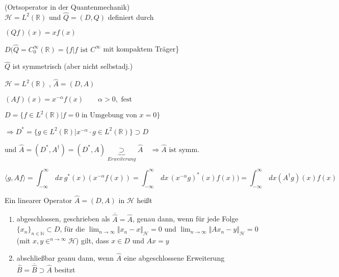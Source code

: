 


\begin{Bsp}{(Ortsoperator in der Quantenmechanik)\\}
    $\mathcal{H} = L^2(\mathbb{R})$ und $\hat{Q} = (D,Q)$ definiert durch

    $(Qf)(x) = x f(x)$

    $D(\hat{Q} = C_0^\infty (\mathbb{R})= \{f | f \textrm{ ist } C^\infty$ mit kompaktem Träger\}

    $\hat{Q}$ ist symmetrisch (aber nicht selbstadj.)
\end{Bsp}

\begin{Bsp}
    $\mathcal{H} = L^2(\mathbb{R})$ , $\hat{A} = (D,A)$

    $(Af)(x) = x^{-\alpha} f(x) \quad \quad \alpha > 0, \textrm{ fest}$

    $D = \{f \in L^2(\mathbb{R}) | f=0 \textrm{ in Umgebung von } x = 0 \}$

    $\Rightarrow D^\ast = \{g \in L^2(\mathbb{R}) | x^{- \alpha} \cdot g \in L^2(\mathbb{R})\} \supset D$

    und $\hat{A} = (D^\ast, A^\dagger) = (D^\ast, A) \underbrace{\supset}_{Erweiterung} \hat{A} \quad \Rightarrow \hat{A} \textrm{ ist symm.}$ 

    $$\langle g , Af \rangle = \int_{-\infty}^\infty \,dx \, g^\ast(x) (x^{- \alpha} f(x)) = 
    \int_{-\infty}^\infty \,dx \, (x^{- \alpha} g)^\ast(x) f(x)) = \int_{-\infty}^\infty \,dx (A^\dagger g)(x) f(x)$$
\end{Bsp}

\begin{Def}
    Ein linearer Operator $\hat{A} = (D,A)$ in $\mathcal{H}$ heißt
    \begin{enumerate}[label=(\alph*)]
        \item abgeschlossen, geschrieben als $\overline{\hat{A}} = \hat{A}$, genau dann, wenn für jede Folge
                $\{x_n\}_{n \in \mathbb{N}} \subset D$, für die $\lim_{n \rightarrow \infty} {\Vert x_n -x \Vert}_\mathcal{H} = 0$ und $\lim_{n \rightarrow \infty} {\Vert Ax_n -y \Vert}_\mathcal{H} = 0$
                (mit $x,y \in^{n \rightarrow \infty} \mathcal{H}$) gilt, dass $x \in D$ und $Ax = y$
        \item abschließbar geanu dann, wenn $\hat{A}$ eine abgeschlossene Erweiterung 
                $\hat{B} = \overline{\hat{B}} \supset \hat{A}$ besitzt
    \end{enumerate}
\end{Def}

